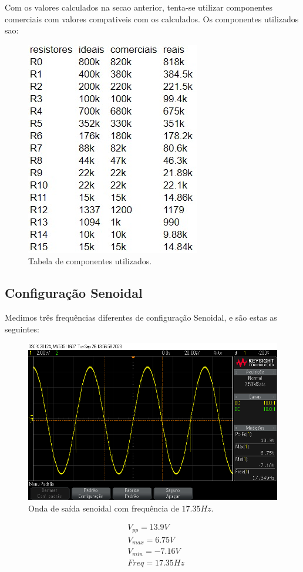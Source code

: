 Com os valores calculados na secao anterior, tenta-se utilizar componentes comerciais com valores compativeis com os calculados. Os componentes utilizados sao:

\begin{figure}[H]
    \centering
    \includegraphics[width=0.35\columnwidth]{images/tabela_componentes.jpeg}
    \caption{Tabela de componentes utilizados.}
\end{figure}

\subsection{Configuração Senoidal}

Medimos três frequências diferentes de configuração Senoidal, e são estas as seguintes:

\begin{figure}[H]
    \centering
    \includegraphics[width=0.5\columnwidth]{images/senoide_2.png}
    \caption{Onda de saída senoidal com frequência de $17.35Hz$.}
\end{figure}

\begin{equation}
    \begin{aligned}
         & V_{pp} = 13.9 V    \\
         & V_{max} = 6.75 V   \\
         & V_{min} =  -7.16 V \\
         & Freq = 17.35 Hz
    \end{aligned}
\end{equation}

